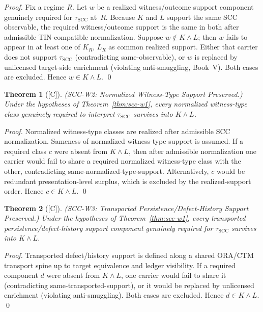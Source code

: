 \documentclass[12pt,oneside]{amsbook}
\theoremstyle{plain}
\newtheorem{theorem}{Theorem}[section]
\theoremstyle{definition}
\theoremstyle{remark}
\newcommand{\status}[1]{\textup{[#1]}}
\begin{document}
\begin{proof}
Fix a regime $R$. Let $w$ be a realized witness/outcome support
component genuinely required for $\tau_{\mathrm{SCC}}$ at~$R$. Because
$K$ and $L$ support the same SCC observable, the required
witness/outcome support is the same in both after admissible
TIN-compatible normalization. Suppose $w \notin K \wedge L$; then
$w$ fails to appear in at least one of $K_R$, $L_R$ as common
realized support. Either that carrier does not support
$\tau_{\mathrm{SCC}}$ (contradicting same-observable), or $w$ is
replaced by unlicensed target-side enrichment (violating
anti-smuggling, Book~V). Both cases are excluded. Hence $w \in
K \wedge L$.
\qed
\end{proof}

\begin{theorem}[\status{C}]\label{thm:scc-w2}
\textup{(SCC-W2: Normalized Witness-Type Support Preserved.)}
Under the hypotheses of Theorem~\ref{thm:scc-w1}, every normalized
witness-type class genuinely required to interpret $\tau_{\mathrm{SCC}}$
survives into $K \wedge L$.
\end{theorem}

\begin{proof}
Normalized witness-type classes are realized after admissible SCC
normalization. Sameness of normalized witness-type support is
assumed. If a required class $c$ were absent from $K \wedge L$, then
after admissible normalization one carrier would fail to share a
required normalized witness-type class with the other, contradicting
same-normalized-type-support. Alternatively, $c$ would be redundant
presentation-level surplus, which is excluded by the realized-support
order. Hence $c \in K \wedge L$.
\qed
\end{proof}

\begin{theorem}[\status{C}]\label{thm:scc-w3}
\textup{(SCC-W3: Transported Persistence/Defect-History Support Preserved.)}
Under the hypotheses of Theorem~\ref{thm:scc-w1}, every transported
persistence/defect-history support component genuinely required for
$\tau_{\mathrm{SCC}}$ survives into $K \wedge L$.
\end{theorem}

\begin{proof}
Transported defect/history support is defined along a shared
ORA/CTM transport spine up to target equivalence and ledger
visibility. If a required component $d$ were absent from
$K \wedge L$, one carrier would fail to share it (contradicting
same-transported-support), or it would be replaced by unlicensed
enrichment (violating anti-smuggling). Both cases are excluded.
Hence $d \in K \wedge L$.
\qed
\end{proof}
\end{document}
